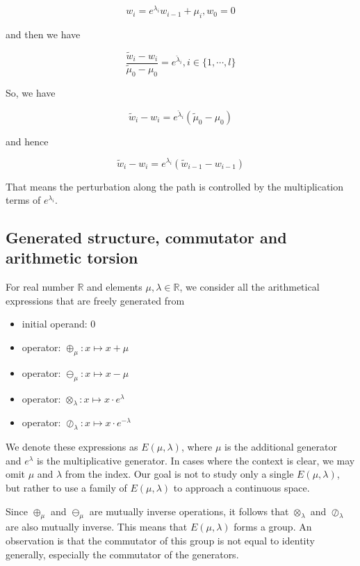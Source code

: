 \documentclass{article}
\numberwithin{definition}{section}
\numberwithin{lemma}{section}
\numberwithin{proposition}{section}
\numberwithin{corollary}{section}
\numberwithin{theorem}{section}
\begin{document}
\[
    w_i = e^{\lambda_i} w_{i-1} + \mu_i, w_0 = 0
\]

and then we have

\begin{equation}
    \frac{\tilde{w}_i - w_i}{\tilde{\mu}_0 - \mu_0} = e^{\check{\lambda}_i}, i \in \{1,\cdots,l\}\label{eq:perturbation1}
\end{equation}

So, we have

\[
    \tilde{w}_i - w_i = e^{\check{\lambda}_i} (\tilde{\mu}_0 - \mu_0)
\]

and hence

\begin{equation}
    \tilde{w}_i - w_i = e^{\lambda_i}(\tilde{w}_{i - 1} - w_{i - 1})\label{eq:perturbation2}
\end{equation}

That means the perturbation along the path is controlled by the multiplication terms of $e^{\lambda_i}$.

\subsection{Generated structure, commutator and arithmetic torsion}\label{subsec:generated-structure}

For real number $\mathbb{R}$ and elements $\mu, \lambda \in \mathbb{R}$, we consider all the arithmetical expressions
that are freely generated from
\begin{itemize}
    \item initial operand: $0$
    \item operator: $\oplus_\mu: x \mapsto x + \mu$
    \item operator: $\ominus_\mu: x \mapsto x - \mu$
    \item operator: $\otimes_\lambda: x \mapsto x \cdot e^\lambda$
    \item operator: $\oslash_\lambda: x \mapsto x \cdot e^{- \lambda}$
\end{itemize}

We denote these expressions as $E(\mu, \lambda)$, where $\mu$ is the additional generator and $e^\lambda$ is the multiplicative generator.
In cases where the context is clear, we may omit $\mu$ and $\lambda$ from the index.
Our goal is not to study only a single $E(\mu, \lambda)$, but rather to use a family of $E(\mu, \lambda)$ to approach a continuous space.

Since $\oplus_\mu$ and $\ominus_\mu$ are mutually inverse operations, it follows that $\otimes_\lambda$ and $\oslash_\lambda$ are also mutually inverse. This means that $E(\mu, \lambda)$ forms a group.
An observation is that the commutator of this group is not equal to identity generally,
especially the commutator of the generators.
\end{document}
